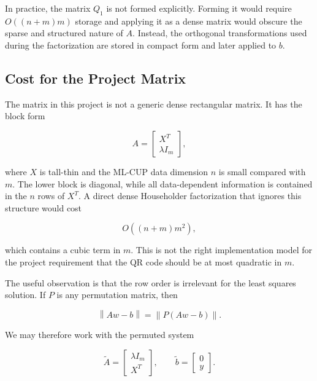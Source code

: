 \documentclass[11pt,a4paper]{article}
\newcommand{\norm}[1]{\left\|#1\right\|}
\begin{document}
In practice, the matrix $Q_1$ is not formed explicitly. Forming it would require 
$O((n+m)m)$ storage and applying it as a dense matrix would obscure the sparse and 
structured nature of $A$. Instead, the orthogonal transformations used during the 
factorization are stored in compact form and later applied to $b$.

\subsection{Cost for the Project Matrix}
\label{sec:qr_cost_project}

The matrix in this project is not a generic dense rectangular matrix. It has the block 
form

\begin{equation}
    A =
    \begin{bmatrix}
        X^T \\ \lambda I_m
    \end{bmatrix},
\end{equation}

where $X$ is tall-thin and the ML-CUP data dimension $n$ is small compared with $m$. 
The lower block is diagonal, while all data-dependent information is contained in the 
$n$ rows of $X^T$. A direct dense Householder factorization that ignores this structure 
would cost

\begin{equation}
    O((n+m)m^2),
\end{equation}

which contains a cubic term in $m$. This is not the right implementation model for the 
project requirement that the QR code should be at most quadratic in $m$.

The useful observation is that the row order is irrelevant for the least squares 
solution. If $P$ is any permutation matrix, then

\begin{equation}
    \norm{Aw-b} = \norm{P(Aw-b)}.
\end{equation}

We may therefore work with the permuted system

\begin{equation}
\label{eq:permuted_augmented}
    \tilde{A} =
    \begin{bmatrix}
        \lambda I_m \\ X^T
    \end{bmatrix},
    \qquad
    \tilde{b} =
    \begin{bmatrix}
        0 \\ y
    \end{bmatrix}.
\end{equation}
\end{document}
